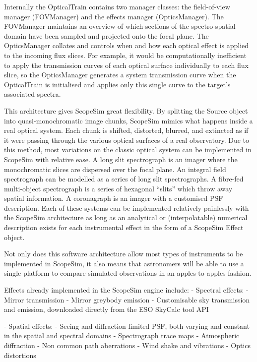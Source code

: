 Internally the OpticalTrain contains two manager classes: the field-of-view
manager (FOVManager) and the effects manager (OpticsManager). The FOVManager
maintains an overview of which sections of the spectro-spatial domain have been
sampled and projected onto the focal plane. The OpticsManager collates and
controls when and how each optical effect is applied to the incoming flux
slices. For example, it would be computationally inefficient to apply the
transmission curves of each optical surface individually to each flux slice, so
the OpticsManager generates a system transmission curve when the OpticalTrain is
initialised and applies only this single curve to the target's associated
spectra.

This architecture gives ScopeSim great flexibility. By splitting the Source
object into quasi-monochromatic image chunks, ScopeSim mimics what happens
inside a real optical system. Each chunk is shifted, distorted, blurred, and
extincted as if it were passing through the various optical surfaces
of a real observatory. Due to this method, most variations on the classic
optical system can be implemented in ScopeSim with relative ease. A long slit
spectrograph is an imager where the monochromatic slices are dispersed
over the focal plane. An integral field spectrograph can be modelled as a series
of long slit spectrographs. A fibre-fed multi-object spectrograph is a series of
hexagonal ``slits'' which throw away spatial information. A coronagraph is an
imager with a customised PSF description. Each of these systems can be
implemented relatively painlessly with the ScopeSim architecture as long as an
analytical or (interpolatable) numerical description exists for each
instrumental effect in the form of a ScopeSim Effect object.

Not only does this software architecture allow most types of instruments to be
implemented in ScopeSim, it also means that astronomers will be able to use a
single platform to compare simulated observations in an apples-to-apples
fashion.

Effects already implemented in the ScopeSim engine include:
- Spectral effects:
    - Mirror transmission
    - Mirror greybody emission
    - Customisable sky transmission and emission, downloaded directly from the
      ESO SkyCalc tool API

- Spatial effects:
    - Seeing and diffraction limited PSF, both varying and constant in the
      spatial and spectral domains
    - Spectrograph trace maps
    - Atmospheric diffraction
    - Non common path aberrations
    - Wind shake and vibrations
    - Optics distortions

